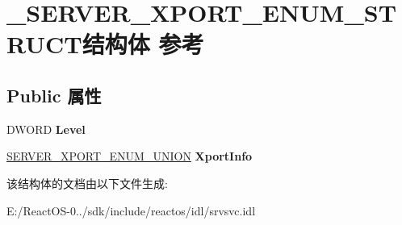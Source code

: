 \hypertarget{struct___s_e_r_v_e_r___x_p_o_r_t___e_n_u_m___s_t_r_u_c_t}{}\section{\+\_\+\+S\+E\+R\+V\+E\+R\+\_\+\+X\+P\+O\+R\+T\+\_\+\+E\+N\+U\+M\+\_\+\+S\+T\+R\+U\+C\+T结构体 参考}
\label{struct___s_e_r_v_e_r___x_p_o_r_t___e_n_u_m___s_t_r_u_c_t}
\subsection*{Public 属性}
\begin{DoxyCompactItemize}
\item 
\mbox{\label{struct___s_e_r_v_e_r___x_p_o_r_t___e_n_u_m___s_t_r_u_c_t_a0511fd12364ba0c2fbc6a016ed3a629c}} 
D\+W\+O\+RD {\bfseries Level}
\item 
\mbox{\label{struct___s_e_r_v_e_r___x_p_o_r_t___e_n_u_m___s_t_r_u_c_t_a4772aeaf75472d1d96dc0260aa3cd4be}} 
\hyperlink{union___s_e_r_v_e_r___x_p_o_r_t___e_n_u_m___u_n_i_o_n}{S\+E\+R\+V\+E\+R\+\_\+\+X\+P\+O\+R\+T\+\_\+\+E\+N\+U\+M\+\_\+\+U\+N\+I\+ON} {\bfseries Xport\+Info}
\end{DoxyCompactItemize}


该结构体的文档由以下文件生成\+:\begin{DoxyCompactItemize}
\item 
E\+:/\+React\+O\+S-\/0../sdk/include/reactos/idl/srvsvc.\+idl\end{DoxyCompactItemize}
